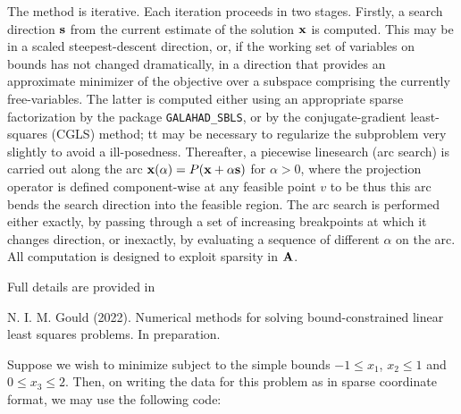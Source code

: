 \documentclass{galahad}
\begin{document}
The method is iterative. Each iteration proceeds in two stages.
Firstly, a search direction ${\mathbf{s}}$ from the current estimate of the solution
${\mathbf{x}}$ is computed. This may be in a scaled steepest-descent direction, or,
if the working set of variables on bounds has not changed dramatically,
in a direction that provides an approximate minimizer of the objective
over a subspace comprising the currently free-variables. The latter is
computed either using an appropriate sparse factorization by the
package {\tt GALAHAD\_SBLS}, or by the
conjugate-gradient least-squares (CGLS) method; tt may be necessary to
regularize the subproblem very slightly to avoid a ill-posedness.
Thereafter, a piecewise linesearch (arc search) is carried out along
the arc ${\mathbf{x}}(\alpha) = P( {\mathbf{x}} + \alpha {\mathbf{s}})$ for $\alpha > 0$,
where the projection operator
is defined component-wise at any feasible point $v$ to be
thus this arc bends the search direction into the feasible region.
The arc search is performed either exactly, by passing through a set
of increasing breakpoints at which it changes direction, or inexactly,
by evaluating a sequence of different $\alpha$  on the arc.
All computation is designed to exploit sparsity in ${\mathbf{A}}$.

\vspace*{1mm}

\galreferences
\vspace*{1mm}

\noindent
Full details are provided in
\vspace*{1mm}

\noindent
N. I. M. Gould (2022).
Numerical methods for solving bound-constrained
linear least squares problems.
In preparation.


\galexample
Suppose we wish to minimize
subject to the simple bounds
$-1  \leq  x_{1}$,
$x_{2} \leq 1$
and $0 \leq x_{3}  \leq  2$.
Then, on writing the data for this problem as
in sparse coordinate format, we may use the following code:
\end{document}

